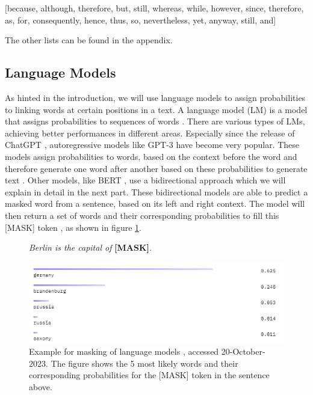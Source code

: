 \begin{center}
	[because, although, therefore, but, still, whereas, while, however, since, therefore, as, for, consequently, hence, thus, so, nevertheless, yet, anyway, still, and]
\end{center}

The other lists can be found in the appendix.

\subsection{Language Models}
As hinted in the introduction, we will use language models to assign probabilities to linking words at certain positions in a text. A language model (LM) is a model that assigns probabilities to sequences of words \cite{languagemodels2023}. There are various types of LMs, achieving better performances in different areas. Especially since the release of ChatGPT \cite{chatgpt}, autoregressive models like GPT-3 have become very popular. These models assign probabilities to words, based on the context before the word and therefore generate one word after another based on these probabilities to generate text \cite{gpt3}. Other models, like BERT \cite{bert}, use a bidirectional approach which we will explain in detail in the next part. These bidirectional models are able to predict a masked word from a sentence, based on its left and right context. The model will then return a set of words and their corresponding probabilities to fill this [MASK] token \cite{bert}, as shown in figure \ref{fig:bert_masking_example}.

\begin{figure}[H]
  \begin{center}
	\textit{Berlin is the capital of} \textbf{[MASK]}.
  \end{center}
  \centering
  \includegraphics[scale=0.9]{fig/bert_masking_example.png}
  \caption{Example for masking of language models \cite{bertbaseuncased}, accessed 20-October-2023. The figure shows the 5 most likely words and their corresponding probabilities for the [MASK] token in the sentence above.}%
  \label{fig:bert_masking_example}
\end{figure}


